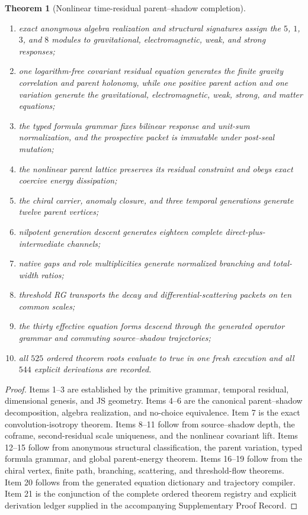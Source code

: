 \documentclass[11pt]{article}
\numberwithin{equation}{section}
\newtheorem{theorem}[definition]{Theorem}
\theoremstyle{remark}
\begin{document}
\begin{theorem}[Nonlinear time-residual parent--shadow completion]
\begin{enumerate}
\item exact anonymous algebra realization and structural signatures assign the $5$, $1$, $3$, and $8$ modules to gravitational, electromagnetic, weak, and strong responses;
\item one logarithm-free covariant residual equation generates the finite gravity correlation and parent holonomy, while one positive parent action and one variation generate the gravitational, electromagnetic, weak, strong, and matter equations;
\item the typed formula grammar fixes bilinear response and unit-sum normalization, and the prospective packet is immutable under post-seal mutation;
\item the nonlinear parent lattice preserves its residual constraint and obeys exact coercive energy dissipation;
\item the chiral carrier, anomaly closure, and three temporal generations generate twelve parent vertices;
\item nilpotent generation descent generates eighteen complete direct-plus-intermediate channels;
\item native gaps and role multiplicities generate normalized branching and total-width ratios;
\item threshold RG transports the decay and differential-scattering packets on ten common scales;
\item the thirty effective equation forms descend through the generated operator grammar and commuting source--shadow trajectories;
\item all $525$ ordered theorem roots evaluate to true in one fresh execution and all $544$ explicit derivations are recorded.
\end{enumerate}
\end{theorem}
\begin{proof}
Items 1--3 are established by the primitive grammar, temporal residual, dimensional genesis, and JS geometry. Items 4--6 are the canonical parent--shadow decomposition, algebra realization, and no-choice equivalence. Item 7 is the exact convolution-isotropy theorem. Items 8--11 follow from source--shadow depth, the coframe, second-residual scale uniqueness, and the nonlinear covariant lift. Items 12--15 follow from anonymous structural classification, the parent variation, typed formula grammar, and global parent-energy theorem. Items 16--19 follow from the chiral vertex, finite path, branching, scattering, and threshold-flow theorems. Item 20 follows from the generated equation dictionary and trajectory compiler. Item 21 is the conjunction of the complete ordered theorem registry and explicit derivation ledger supplied in the accompanying Supplementary Proof Record.
\end{proof}
\end{document}
